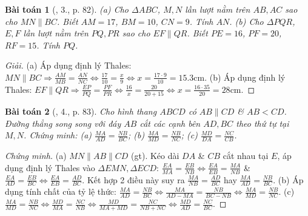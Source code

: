 \documentclass{article}
\newtheorem{baitoan}{Bài toán}
\begin{document}
\begin{baitoan}[\cite{SBT_Toan_8_tap_2}, 3., p. 82]
	(a) Cho $\Delta ABC$, $M,N$ lần lượt nằm trên $AB,AC$ sao cho $MN\parallel BC$. Biết $AM = 17$, $BM = 10$, $CN = 9$. Tính $AN$. (b) Cho $\Delta PQR$, $E,F$ lần lượt nằm trên $PQ,PR$ sao cho $EF\parallel QR$. Biết $PE = 16$, $PF = 20$, $RF = 15$. Tính $PQ$.
\end{baitoan}

\begin{proof}[Giải]
	(a) Áp dụng định lý Thales: $MN\parallel BC\Rightarrow\frac{AM}{MB} = \frac{AN}{NC}\Leftrightarrow\frac{17}{10} = \frac{x}{9}\Leftrightarrow x = \frac{17\cdot9}{10} = 15.3$cm. (b) Áp dụng định lý Thales: $EF\parallel QR\Rightarrow\frac{EP}{PQ} = \frac{PF}{PR}\Leftrightarrow\frac{16}{x} = \frac{20}{20 + 15}\Leftrightarrow x = \frac{16\cdot35}{20} = 28$cm.
\end{proof}

\begin{baitoan}[\cite{SBT_Toan_8_tap_2}, 4., p. 83]
	Cho hình thang $ABCD$ có $AB\parallel CD$ \& $AB < CD$. Đường thẳng song song với đáy $AB$ cắt các cạnh bên $AD,BC$ theo thứ tự tại $M,N$. Chứng minh: (a) $\frac{MA}{AD} = \frac{NB}{BC}$; (b) $\frac{MA}{MD} = \frac{NB}{NC}$; (c) $\frac{MD}{DA} = \frac{NC}{CB}$.
\end{baitoan}

\begin{proof}[Chứng minh]
	(a) $MN\parallel AB\parallel CD$ (gt). Kéo dài $DA$ \& $CB$ cắt nhau tại $E$, áp dụng định lý Thales vào $\Delta EMN,\Delta ECD$: $\frac{EA}{MA} = \frac{EB}{NB}\Leftrightarrow\frac{EA}{EB} = \frac{MA}{NB}$ \& $\frac{EA}{AD} = \frac{EB}{BC}\Leftrightarrow\frac{EA}{EB} = \frac{AD}{BC}$. Kết hợp 2 điều này suy ra $\frac{MA}{NB} = \frac{AD}{BC}$ hay $\frac{MA}{AD} = \frac{NB}{BC}$. (b) Áp dụng tính chất của tỷ lệ thức: $\frac{MA}{AD} = \frac{NB}{BC}\Leftrightarrow\frac{MA}{AD - MA} = \frac{NB}{BC - NB}\Leftrightarrow\frac{MA}{MD} = \frac{NB}{NC}$. (c) $\frac{MA}{MD} = \frac{NB}{NC}\Leftrightarrow\frac{MD}{MA} = \frac{NC}{NB}\Leftrightarrow\frac{MD}{MA + MD} = \frac{NC}{NB + NC}\Leftrightarrow\frac{MD}{AD} = \frac{NC}{BC}$.
\end{proof}
\end{document}
